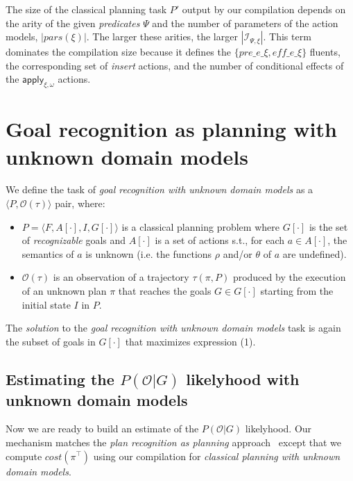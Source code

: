 \documentclass[letterpaper]{article} %
\newcommand{\tup}[1]{{\langle #1 \rangle}}
\begin{document}
The size of the classical planning task $P'$ output by our compilation depends on the arity of the given {\em predicates} $\Psi$ and the number of parameters of the action models, $|pars(\xi)|$. The larger these arities, the larger $|{\mathcal I}_{\Psi,\xi}|$. This term dominates the compilation size because it defines the $\{pre\_e\_\xi, eff\_e\_\xi\}$ fluents, the corresponding set of {\em insert} actions, and the number of conditional effects of the $\mathsf{apply_{\xi,\omega}}$ actions. 



\section{Goal recognition as planning with unknown domain models}
\label{sec:recognition}

We define the task of {\em goal recognition with unknown domain models} as a $\tup{P,\mathcal{O}(\tau)}$ pair, where:
\begin{itemize}
\item $P=\tup{F,A[\cdot],I,G[\cdot]}$ is a classical planning problem where $G[\cdot]$ is the set of {\em recognizable} goals and $A[\cdot]$ is a set of actions s.t., for each $a\in A[\cdot]$, the semantics of $a$ is unknown (i.e. the functions $\rho$ and/or $\theta$ of $a$ are undefined).
\item $\mathcal{O}(\tau)$ is an observation of a trajectory $\tau(\pi,P)$ produced by the execution of an unknown plan $\pi$ that reaches the goals $G\in G[\cdot]$ starting from the initial state $I$ in $P$.
\end{itemize}

The {\em solution} to the {\em goal recognition with unknown domain models} task is again the subset of goals in $G[\cdot]$ that maximizes expression (1). 

\subsection{Estimating the $P(\mathcal{O}|G)$ likelyhood with unknown domain models}
Now we are ready to build an estimate of the $P(\mathcal{O}|G)$ likelyhood. Our mechanism matches the {\em plan recognition as planning} approach~\cite{ramirez2012plan} except that we compute $cost(\pi^\top)$ using our compilation for {\em classical planning with unknown domain models}.
\end{document}
